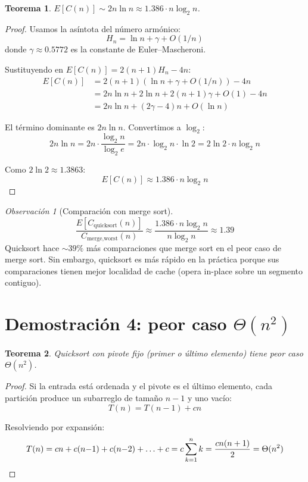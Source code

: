 \documentclass[11pt, letterpaper]{article}
\theoremstyle{definition}
\theoremstyle{plain}
\newtheorem{theorem}{Teorema}[section]
\theoremstyle{remark}
\newtheorem{remark}{Observación}[section]
\begin{document}
\begin{theorem}\label{thm:asymptotic}
$E[C(n)] \sim 2n \ln n \approx 1.386 \cdot n \log_2 n$.
\end{theorem}

\begin{proof}
Usamos la asíntota del número armónico:
\[
  H_n = \ln n + \gamma + O(1/n)
\]
donde $\gamma \approx 0.5772$ es la constante de Euler--Mascheroni.

Sustituyendo en $E[C(n)] = 2(n+1)H_n - 4n$:
\begin{align*}
  E[C(n)] &= 2(n+1)(\ln n + \gamma + O(1/n)) - 4n \\
          &= 2n\ln n + 2\ln n + 2(n+1)\gamma + O(1) - 4n \\
          &= 2n\ln n + (2\gamma - 4)n + O(\ln n)
\end{align*}

El término dominante es $2n\ln n$. Convertimos a $\log_2$:
\[
  2n\ln n = 2n \cdot \frac{\log_2 n}{\log_2 e}
          = 2n \cdot \log_2 n \cdot \ln 2
          = 2\ln 2 \cdot n\log_2 n
\]

Como $2\ln 2 \approx 1.3863$:
\[
  E[C(n)] \approx 1.386 \cdot n \log_2 n
\]
\end{proof}

\begin{remark}[Comparación con merge sort]
\[
  \frac{E[C_{\text{quicksort}}(n)]}{C_{\text{merge,worst}}(n)}
  \approx \frac{1.386 \cdot n\log_2 n}{n\log_2 n} \approx 1.39
\]
Quicksort hace ${\sim}39\%$ más comparaciones que merge sort en el
peor caso de merge sort. Sin embargo, quicksort es más rápido en la
práctica porque sus comparaciones tienen mejor localidad de cache
(opera in-place sobre un segmento contiguo).
\end{remark}

\section{Demostración 4: peor caso
  \texorpdfstring{$\Theta(n^2)$}{Theta(n\^2)}}

\begin{theorem}\label{thm:worst}
Quicksort con pivote fijo (primer o último elemento) tiene peor caso
$\Theta(n^2)$.
\end{theorem}

\begin{proof}
Si la entrada está ordenada y el pivote es el último elemento, cada
partición produce un subarreglo de tamaño $n - 1$ y uno vacío:
\[
  T(n) = T(n-1) + cn
\]

Resolviendo por expansión:
\[
  T(n) = cn + c(n{-}1) + c(n{-}2) + \ldots + c
       = c\sum_{k=1}^{n} k
       = \frac{cn(n+1)}{2}
       = \Theta(n^2) \qedhere
\]
\end{proof}
\end{document}
